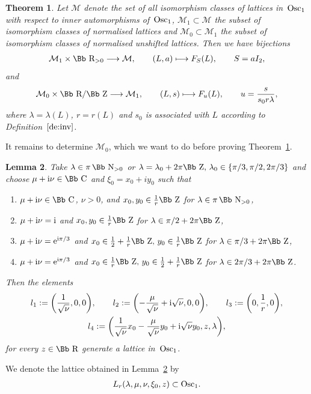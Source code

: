 \documentclass[pdftex]{sigma}
\newcommand\CC{{\mbox{\Bb C}}}
\newcommand\RR{{\mbox{\Bb R}}}
\newcommand\NN{{\mbox{\Bb N}}}
\newcommand\ZZ{{\mbox{\Bb Z}}}
\newcommand\cM{{\mathcal M}}
\newcommand{\Osc}{{\rm Osc}}
\newcommand{\benur}{\begin{enumerate}[label=$(\roman*)$]\itemsep=0pt}
\numberwithin{equation}{section}
\newtheorem{Theorem}{Theorem}[section]
\newtheorem{Lemma}[Theorem]{Lemma}
\begin{document}
\begin{Theorem} \label{MMM}
Let $\cM$ denote the set of all isomorphism classes of lattices in~$\Osc_1$ with respect to inner automorphisms of~$\Osc_1$, $\cM_1\subset \cM$ the subset of isomorphism classes of normalised lattices and $\cM_0\subset\cM_1$ the subset of isomorphism classes of normalised unshifted lattices. Then we have bijections
\begin{gather*}
\cM_1\times\RR_{>0} \longrightarrow \cM,\qquad (L,a)\longmapsto F_S(L),\qquad S=a I_2,
\end{gather*}
and
\begin{gather}\label{M0M1}
\cM_0 \times \RR/\ZZ \longrightarrow \cM_1,\qquad (L,s) \longmapsto F_u(L),\qquad u=\frac {s}{s_0r\lambda},
\end{gather}
where $\lambda=\lambda(L)$, $r=r(L)$ and $s_0$ is associated with $L$ according to Definition~$\ref{de:inv}$.
\end{Theorem}
It remains to determine $\cM_0$, which we want to do before proving Theorem~\ref{MMM}.
\begin{Lemma}\label{lmlattice} Take $\lambda\in \pi\, \NN_{>0}$ or $\lambda= \lambda_0+2\pi\ZZ,\, \lambda_0\in \{\pi/3, \pi/2, 2\pi/3\}$ and choose $\mu+{\rm i}\nu\in\CC$ and $\xi_0=x_0+iy_0$ such that
\benur
\item $\mu+{\rm i}\nu\in \CC$, $\nu>0$, and $x_0,y_0\in \frac1r \ZZ$ for $\lambda \in \pi\,\NN_{>0}$,
\item $\mu+{\rm i}\nu = {\rm i}$ and $x_0,y_0\in \frac1r \ZZ$ for $\lambda \in \pi/2+2\pi\ZZ$,
\item $\mu+{\rm i}\nu ={\rm e}^{{\rm i}\pi/3}$ and $x_0\in \frac12+\frac1r \ZZ,\, y_0\in \frac1r \ZZ$ for $\lambda \in \pi/3+2\pi\ZZ$,
\item $\mu+{\rm i}\nu ={\rm e}^{{\rm i}\pi/3}$ and $x_0\in \frac1r \ZZ,\, y_0\in\frac12+ \frac1r \ZZ$ for $\lambda \in 2\pi/3+2\pi\ZZ$.
\end{enumerate}
Then the elements
\begin{gather*}
 l_1:=\bigg(\frac{1}{\sqrt\nu},0,0\bigg),\qquad
 l_2:=\bigg({-}\frac{\mu}{\sqrt\nu}+{\rm i}\sqrt\nu,0,0\bigg),\qquad
 l_3:=\bigg(0,\frac{1}{r},0\bigg),
 \\
l_4:=\bigg(\frac{1}{\sqrt\nu}x_0-\frac{\mu}{\sqrt\nu}y_0+{\rm i}\sqrt\nu y_0,z,\lambda \bigg),
\end{gather*}
for every $z\in\RR$ generate a lattice in~$\Osc_1$.
\end{Lemma}
%
\begin{Definition}%
We denote the lattice obtained in Lemma~\ref{lmlattice} by
\begin{gather*}
L_r(\lambda,\mu,\nu,\xi_0,z)\subset \Osc_1.
\end{gather*}
\end{Definition}
\end{document}
